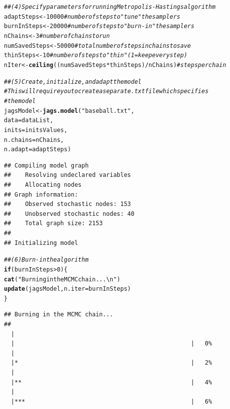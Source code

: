\documentclass{article}\usepackage[]{graphicx}\usepackage[]{color}
\makeatletter
\newcommand{\hlnum}[1]{\textcolor[rgb]{0.686,0.059,0.569}{#1}}%
\newcommand{\hlstr}[1]{\textcolor[rgb]{0.192,0.494,0.8}{#1}}%
\newcommand{\hlcom}[1]{\textcolor[rgb]{0.678,0.584,0.686}{\textit{#1}}}%
\newcommand{\hlopt}[1]{\textcolor[rgb]{0,0,0}{#1}}%
\newcommand{\hlstd}[1]{\textcolor[rgb]{0.345,0.345,0.345}{#1}}%
\newcommand{\hlkwa}[1]{\textcolor[rgb]{0.161,0.373,0.58}{\textbf{#1}}}%
\newcommand{\hlkwb}[1]{\textcolor[rgb]{0.69,0.353,0.396}{#1}}%
\newcommand{\hlkwc}[1]{\textcolor[rgb]{0.333,0.667,0.333}{#1}}%
\newcommand{\hlkwd}[1]{\textcolor[rgb]{0.737,0.353,0.396}{\textbf{#1}}}%
\newenvironment{kframe}{%
 \def\at@end@of@kframe{}%
 \ifinner\ifhmode%
  \def\at@end@of@kframe{\end{minipage}}%
  \begin{minipage}{\columnwidth}%
 \fi\fi%
 \def\FrameCommand##1{\hskip\@totalleftmargin \hskip-\fboxsep
 \colorbox{shadecolor}{##1}\hskip-\fboxsep
     \hskip-\linewidth \hskip-\@totalleftmargin \hskip\columnwidth}%
 \MakeFramed {\advance\hsize-\width
   \@totalleftmargin\z@ \linewidth\hsize
   \@setminipage}}%
 {\par\unskip\endMakeFramed%
 \at@end@of@kframe}
\newenvironment{knitrout}{}{} %
\makeatother
\begin{document}
\begin{knitrout}
\begin{kframe}
\begin{alltt}
\hlcom{## (4) Specify parameters for running Metropolis-Hastings algorithm}
\hlstd{adaptSteps} \hlkwb{<-} \hlnum{10000}              \hlcom{# number of steps to "tune" the samplers}
\hlstd{burnInSteps} \hlkwb{<-} \hlnum{20000}             \hlcom{# number of steps to "burn-in" the samplers}
\hlstd{nChains} \hlkwb{<-} \hlnum{3}                    \hlcom{# number of chains to run}
\hlstd{numSavedSteps} \hlkwb{<-} \hlnum{50000}          \hlcom{# total number of steps in chains to save}
\hlstd{thinSteps} \hlkwb{<-} \hlnum{10}                  \hlcom{# number of steps to "thin" (1 = keep every step)}
\hlstd{nIter} \hlkwb{<-} \hlkwd{ceiling}\hlstd{((numSavedSteps}\hlopt{*}\hlstd{thinSteps)}\hlopt{/}\hlstd{nChains)}     \hlcom{# steps per chain}

\hlcom{## (5) Create, initialize, and adapt the model}
\hlcom{# This will require you to create a separate .txt file which specifies}
\hlcom{# the model}
\hlstd{jagsModel} \hlkwb{<-} \hlkwd{jags.model}\hlstd{(}\hlstr{"baseball.txt"}\hlstd{,}
                         \hlkwc{data} \hlstd{= dataList,}
                         \hlkwc{inits} \hlstd{= initsValues,}
                         \hlkwc{n.chains} \hlstd{= nChains,}
                         \hlkwc{n.adapt} \hlstd{= adaptSteps)}
\end{alltt}
\begin{verbatim}
## Compiling model graph
##    Resolving undeclared variables
##    Allocating nodes
## Graph information:
##    Observed stochastic nodes: 153
##    Unobserved stochastic nodes: 40
##    Total graph size: 2153
## 
## Initializing model
\end{verbatim}
\begin{alltt}
\hlcom{## (6) Burn-in the algorithm}
\hlkwa{if}\hlstd{(burnInSteps}\hlopt{>}\hlnum{0}\hlstd{)\{}
  \hlkwd{cat}\hlstd{(} \hlstr{"Burning in the MCMC chain...\textbackslash{}n"}\hlstd{)}
  \hlkwd{update}\hlstd{(jagsModel,} \hlkwc{n.iter} \hlstd{= burnInSteps)}
\hlstd{\}}
\end{alltt}
\begin{verbatim}
## Burning in the MCMC chain...
## 
  |                                                        
  |                                                  |   0%
  |                                                        
  |*                                                 |   2%
  |                                                        
  |**                                                |   4%
  |                                                        
  |***                                               |   6%

\end{verbatim}
\end{kframe}
\end{knitrout}
\end{document}

